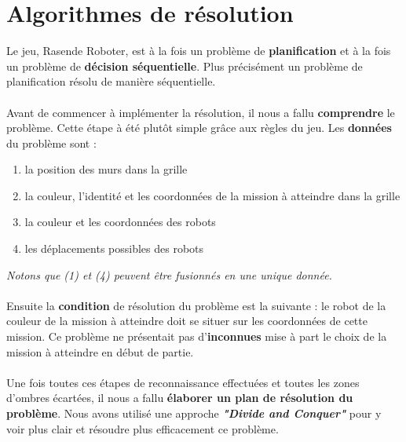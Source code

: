 \documentclass{article}
\begin{document}
\section{Algorithmes de résolution}
Le jeu, Rasende Roboter, est à la fois un problème de \textbf{planification} et à la fois un problème de \textbf{décision séquentielle}. Plus précisément un problème de planification résolu de manière séquentielle.\\\\
Avant de commencer à implémenter la résolution, il nous a fallu \textbf{comprendre} le problème. Cette étape à été plutôt simple grâce aux règles du jeu. Les \textbf{données} du problème sont : 
\begin{enumerate}
\item  la position des murs dans la grille
\item  la couleur, l'identité et les coordonnées de la mission à atteindre dans la grille
\item  la couleur et les coordonnées des robots 
\item  les déplacements possibles des robots
\end{enumerate}
\textit{Notons que (1) et (4) peuvent être fusionnés en une unique donnée.}\\\\
Ensuite la \textbf{condition} de résolution du problème est la suivante : le robot de la couleur de la mission à atteindre doit se situer sur les coordonnées de cette mission. Ce problème ne présentait pas d'\textbf{inconnues} mise à part le choix de la mission à atteindre en début de partie.\\\\Une fois toutes ces étapes de reconnaissance effectuées et toutes les zones d'ombres écartées, il nous a fallu \textbf{élaborer un plan de résolution du problème}. Nous avons utilisé une approche \textit{\textbf{"Divide and Conquer"}} pour y voir plus clair et résoudre plus efficacement ce problème.
\end{document}
